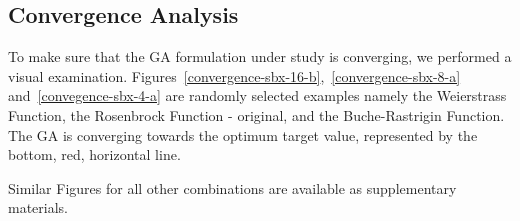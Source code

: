 \subsection{Convergence Analysis}

To make sure that the GA formulation under study is converging, we performed a visual examination. Figures~\ref{convergence-sbx-16-b},~\ref{convergence-sbx-8-a} and~\ref{convegence-sbx-4-a} are randomly selected examples namely the Weierstrass Function, the Rosenbrock Function - original, and the Buche-Rastrigin Function. The GA is converging towards the optimum target value, represented by the bottom, red, horizontal line.

Similar Figures for all other combinations are available as supplementary materials.

